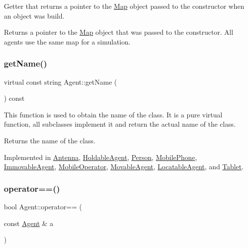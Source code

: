 Getter that returns a pointer to the \hyperlink{class_map}{Map} object passed to the constructor when an object was build. \begin{DoxyReturn}{Returns}
a pointer to the \hyperlink{class_map}{Map} object that was passed to the constructor. All agents use the same map for a simulation. 
\end{DoxyReturn}
\mbox{\label{class_agent_afe6c72d91baf9ee4fe77ea1ed7fef3ba}} 
\subsubsection{\texorpdfstring{get\+Name()}{getName()}}
{\footnotesize\ttfamily virtual const string Agent\+::get\+Name (\begin{DoxyParamCaption}{ }\end{DoxyParamCaption}) const\hspace{0.3cm}{\ttfamily [pure virtual]}}

This function is used to obtain the name of the class. It is a pure virtual function, all subclasses implement it and return the actual name of the class. \begin{DoxyReturn}{Returns}
the name of the class. 
\end{DoxyReturn}


Implemented in \hyperlink{class_antenna_a4ad9da1ca9d79f20b331c22b94c57a02}{Antenna}, \hyperlink{class_holdable_agent_ab330bb40de51a957ef8826af629f94a2}{Holdable\+Agent}, \hyperlink{class_person_aa2a6f8d7f1d94045a03ca578f2ed272c}{Person}, \hyperlink{class_mobile_phone_a1eeac3141baafa75ebcf26fc3a0e4068}{Mobile\+Phone}, \hyperlink{class_immovable_agent_ae8fbccc744f6f806e47dfd242fa67a1c}{Immovable\+Agent}, \hyperlink{class_mobile_operator_a2b4538d96f7aa898e6e470411d40cbf7}{Mobile\+Operator}, \hyperlink{class_movable_agent_abcc1218876c39c996f2cb1eba2b96379}{Movable\+Agent}, \hyperlink{class_locatable_agent_a754105958bb672744b525538f1584a7b}{Locatable\+Agent}, and \hyperlink{class_tablet_adc7196aaee1e9714236b7cd8825d5826}{Tablet}.

\mbox{\label{class_agent_afa2b3a408bb0694aea46fb2bb59bacf7}} 
\subsubsection{\texorpdfstring{operator==()}{operator==()}}
{\footnotesize\ttfamily bool Agent\+::operator== (\begin{DoxyParamCaption}\item[{const \hyperlink{class_agent}{Agent} \&}]{a }\end{DoxyParamCaption})}

